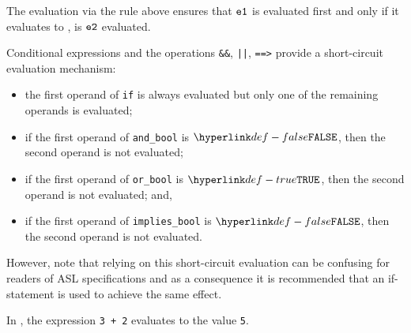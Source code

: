 \FormallyParagraph
\begin{mathpar}
\end{mathpar}
The evaluation via the rule above ensures that $\veone$ is evaluated first and only if
it evaluates to \True, is $\vetwo$ evaluated.


Conditional expressions and the operations \texttt{\&\&}, \texttt{||},
\texttt{==>} provide a short-circuit evaluation mechanism:

\begin{itemize}
\item the first operand of \texttt{if} is always evaluated but only one of the
remaining operands is evaluated;
\item if the first operand of \texttt{and\_bool} is $\False$, then the second operand is not evaluated;
\item if the first operand of \texttt{or\_bool} is $\True$, then the second operand is not evaluated; and,
\item if the first operand of \texttt{implies\_bool} is $\False$, then the
second operand is not evaluated.
\end{itemize}

However, note that relying on this short-circuit evaluation can be confusing
for readers of ASL specifications and as a consequence it is recommended that
an if-statement is used to achieve the same effect.

In ,
the expression \texttt{3 + 2} evaluates to the value \texttt{5}.

